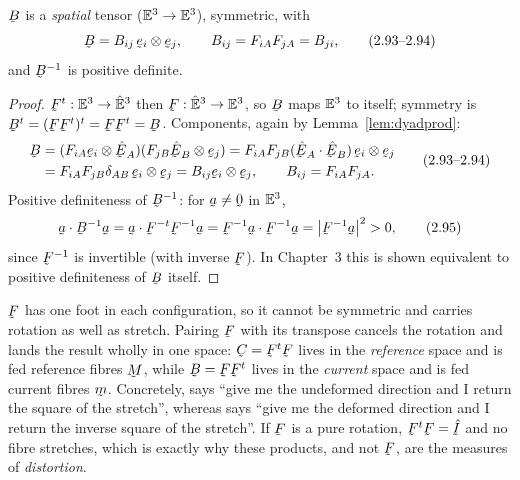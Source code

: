 \begin{proposition}[Properties of $\bB$]\label{prop:B}
$\bB$ is a \emph{spatial} tensor ($\mathbb{E}^{3}\to\mathbb{E}^{3}$), symmetric, with
\begin{equation}
   \bB=B_{ij}\,\be_i\otimes\be_j,\qquad B_{ij}=F_{iA}F_{jA}=B_{ji}, \tag{2.93--2.94}\label{eq:2.93}
\end{equation}
and $\bB^{-1}$ is positive definite.
\end{proposition}

\begin{proof}
$\bF^{t}:\Vt\to\hVt$ then $\bF:\hVt\to\Vt$, so $\bB$ maps $\mathbb{E}^{3}$ to itself;
symmetry is $\bB^{t}=(\bF\bF^{t})^{t}=\bF\bF^{t}=\bB$. Components, again by
Lemma~\ref{lem:dyadprod}:
\begin{equation}
\begin{aligned}
   \bB&=(F_{iA}\be_i\otimes\hbE_A)(F_{jB}\hbE_B\otimes\be_j)
   =F_{iA}F_{jB}(\ip{\hbE_A}{\hbE_B})\,\be_i\otimes\be_j\\
   &=F_{iA}F_{jB}\dd_{AB}\,\be_i\otimes\be_j=B_{ij}\be_i\otimes\be_j,
   \qquad B_{ij}=F_{iA}F_{jA}.
\end{aligned}\tag{2.93--2.94}
\end{equation}
Positive definiteness of $\bB^{-1}$: for $\ba\neq\bze$ in $\mathbb{E}^{3}$,
\begin{equation}
   \ip\ba{\bB^{-1}\ba}=\ip\ba{\bF^{-t}\bF^{-1}\ba}
   =\ip{\bF^{-1}\ba}{\bF^{-1}\ba}=\big|\bF^{-1}\ba\big|^{2}>0, \tag{2.95}\label{eq:2.95}
\end{equation}
since $\bF^{-1}$ is invertible (with inverse $\bF$). In Chapter~3 this is
shown equivalent to positive definiteness of $\bB$ itself.
\end{proof}

\begin{remark}\label{rem:CBintuition}
$\bF$ has one foot in each configuration, so it cannot be symmetric and
carries rotation as well as stretch. Pairing $\bF$ with its transpose
cancels the rotation and lands the result wholly in one space:
$\bC=\bF^{t}\bF$ lives in the \emph{reference} space and is fed reference
fibres $\bM$, while $\bB=\bF\bF^{t}$ lives in the \emph{current} space and
is fed current fibres $\bmm$. Concretely,  says ``give me the
undeformed direction and I return the square of the stretch'', whereas
 says ``give me the deformed direction and I return the inverse
square of the stretch''. If $\bF$ is a pure rotation, $\bF^{t}\bF=\hat\I$
and no fibre stretches, which is exactly why these products, and not $\bF$,
are the measures of \emph{distortion}.
\end{remark}

